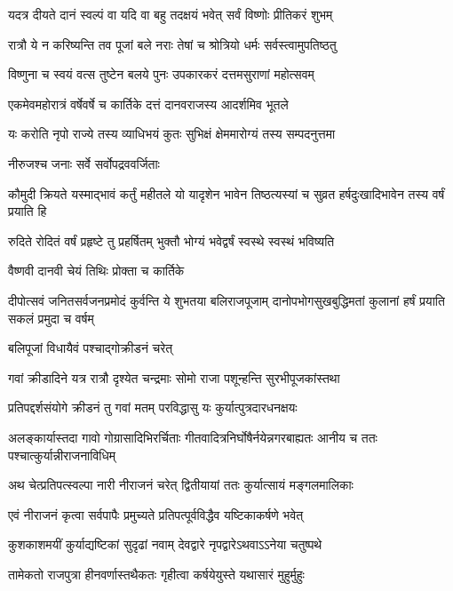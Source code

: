 \twolineshloka
{यदत्र दीयते दानं स्वल्पं वा यदि वा बहु}
{तदक्षयं भवेत् सर्वं विष्णोः प्रीतिकरं शुभम्} %

\twolineshloka
{रात्रौ ये न करिष्यन्ति तव पूजां बले नराः}
{तेषां च श्रोत्रियो धर्मः सर्वस्त्वामुपतिष्ठतु} %

\twolineshloka
{विष्णुना च स्वयं वत्स तुष्टेन बलये पुनः}
{उपकारकरं दत्तमसुराणां महोत्सवम्} %

\twolineshloka
{एकमेवमहोरात्रं वर्षेवर्षे च कार्तिके}
{दत्तं दानवराजस्य आदर्शमिव भूतले} %

\twolineshloka
{यः करोति नृपो राज्ये तस्य व्याधिभयं कुतः}
{सुभिक्षं क्षेममारोग्यं तस्य सम्पदनुत्तमा} %


\onelineshloka
{नीरुजश्च जनाः सर्वे सर्वोपद्रववर्जिताः} %

\threelineshloka
{कौमुदी क्रियते यस्माद्भावं कर्तुं महीतले}
{यो यादृशेन भावेन तिष्ठत्यस्यां च सुव्रत}
{हर्षदुःखादिभावेन तस्य वर्षं प्रयाति हि} %

\twolineshloka
{रुदिते रोदितं वर्षं प्रहृष्टे तु प्रहर्षितम्}
{भुक्तौ भोग्यं भवेद्वर्षं स्वस्थे स्वस्थं भविष्यति} %


\onelineshloka
{वैष्णवी दानवी चेयं तिथिः प्रोक्ता च कार्तिके} %

\fourlineindentedshloka
{दीपोत्सवं जनितसर्वजनप्रमोदं}
{कुर्वन्ति ये शुभतया बलिराजपूजाम्}
{दानोपभोगसुखबुद्धिमतां कुलानां}
{हर्षं प्रयाति सकलं प्रमुदा च वर्षम्} %


\onelineshloka
{बलिपूजां विधायैवं पश्चाद्गोक्रीडनं चरेत्} %

\twolineshloka
{गवां क्रीडादिने यत्र रात्रौ दृश्येत चन्द्रमाः}
{सोमो राजा पशून्हन्ति सुरभीपूजकांस्तथा} %

\twolineshloka
{प्रतिपद्दर्शसंयोगे क्रीडनं तु गवां मतम्}
{परविद्धासु यः कुर्यात्पुत्रदारधनक्षयः} %

\threelineshloka
{अलङ्कार्यास्तदा गावो गोग्रासादिभिरर्चिताः}
{गीतवादित्रनिर्घोषैर्नयेन्नगरबाह्यतः}
{आनीय च ततः पश्चात्कुर्यान्नीराजनाविधिम्} %

\twolineshloka
{अथ चेत्प्रतिपत्स्वल्पा नारी नीराजनं चरेत्}
{द्वितीयायां ततः कुर्यात्सायं मङ्गलमालिकाः} %

\twolineshloka
{एवं नीराजनं कृत्वा सर्वपापैः प्रमुच्यते}
{प्रतिपत्पूर्वविद्धैव यष्टिकाकर्षणे भवेत्} %

\twolineshloka
{कुशकाशमयीं कुर्याद्यष्टिकां सुदृढां नवाम्}
{देवद्वारे नृपद्वारेऽथवाऽऽनेया चतुष्पथे} %

\twolineshloka
{तामेकतो राजपुत्रा हीनवर्णास्तथैकतः}
{गृहीत्वा कर्षयेयुस्ते यथासारं मुहुर्मुहुः} %


